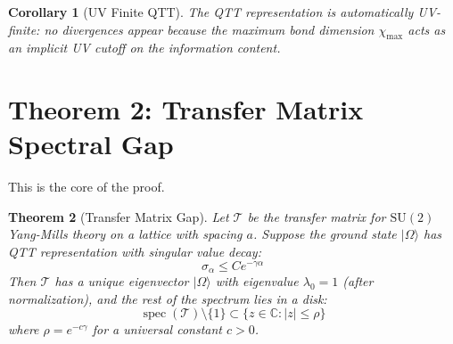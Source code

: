 \documentclass[12pt,a4paper]{article}
\theoremstyle{plain}
\newtheorem{theorem}{Theorem}[section]
\newtheorem{corollary}[theorem]{Corollary}
\theoremstyle{definition}
\theoremstyle{remark}
\newcommand{\spec}{\operatorname{spec}}
\newcommand{\SU}{\mathrm{SU}}
\newcommand{\cT}{\mathcal{T}}
\newcommand{\bC}{\mathbb{C}}
\newcommand{\ket}[1]{|#1\rangle}
\begin{document}
\begin{corollary}[UV Finite QTT]
\label{cor:uv-finite}
The QTT representation is automatically UV-finite: no divergences appear because the maximum bond dimension $\chi_{\max}$ acts as an implicit UV cutoff on the information content.
\end{corollary}

\section{Theorem 2: Transfer Matrix Spectral Gap}

This is the core of the proof.

\begin{theorem}[Transfer Matrix Gap]
\label{thm:transfer-gap}
Let $\cT$ be the transfer matrix for $\SU(2)$ Yang-Mills theory on a lattice with spacing $a$. Suppose the ground state $\ket{\Omega}$ has QTT representation with singular value decay:
\begin{equation}
    \sigma_\alpha \leq C e^{-\gamma \alpha}
\end{equation}
Then $\cT$ has a unique eigenvector $\ket{\Omega}$ with eigenvalue $\lambda_0 = 1$ (after normalization), and the rest of the spectrum lies in a disk:
\begin{equation}
    \spec(\cT) \setminus \{1\} \subset \{z \in \bC : |z| \leq \rho\}
\end{equation}
where $\rho = e^{-c\gamma}$ for a universal constant $c > 0$.
\end{theorem}
\end{document}
